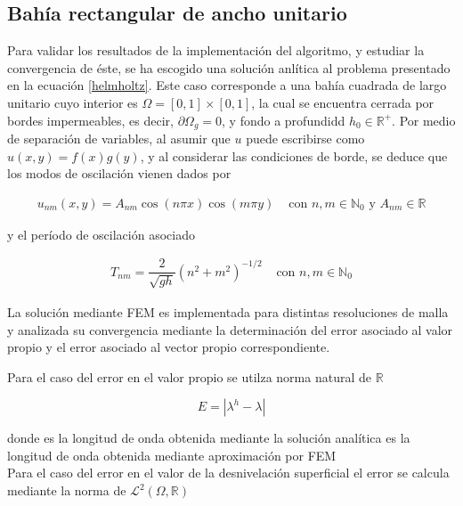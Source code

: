  \subsection{Bah\'ia rectangular de ancho unitario}
  Para validar los resultados de la implementaci\'on del algoritmo, y estudiar la convergencia de \'este, se ha escogido una soluci\'on anl\'itica al problema presentado en la ecuaci\'on \eqref{helmholtz}. Este caso corresponde a una bah\'ia cuadrada de largo unitario cuyo interior es $\Omega = [0,1]\times[0,1]$, la cual se encuentra cerrada por bordes impermeables, es decir, $\partial \Omega_g=0$, y fondo a profundidd $h_0\in\mathbb{R^+}$. Por medio de separaci\'on de variables, al asumir que $u$ puede escribirse como $u(x,y)=f(x)g(y)$, y al considerar las condiciones de borde, se deduce que los modos de oscilaci\'on vienen dados por 
  
  \begin{equation}
    \begin{array}{cc}
    u_{nm}(x,y)=A_{nm}\cos(n\pi x)\cos(m\pi y) & \text{ con } n,m \in \mathbb{N}_0 \text{ y } A_{nm}\in\mathbb{R}
    \end{array}
    \label{eq:bahia_cerrada_modo}
  \end{equation}

  y el per\'iodo de oscilaci\'on asociado
  
  \begin{equation}
    \begin{array}{cc}
    T_{nm}=\dfrac{2}{\sqrt{gh}}\left( n^2+m^2\right)^{-1/2} & \text{ con } n,m \in \mathbb{N}_0
    \end{array}
    \label{eq:bahia_cerrada_periodo}
  \end{equation}

La soluci\'on mediante FEM es implementada para distintas resoluciones de malla y analizada su convergencia mediante la determinaci\'on del error asociado al valor propio y el error asociado al vector propio correspondiente.

Para el caso del error en el valor propio se utilza norma natural de $\mathbb{R}$

$$E = |\lambda^h - \lambda|$$

donde  \hilight{$\lambda$} es la longitud de onda obtenida mediante la soluci\'on anal\'itica  es la longitud de onda obtenida mediante aproximaci\'on por FEM\\

Para el caso del error en el valor de la desnivelaci\'on superficial el error se calcula mediante la norma de $\mathcal{L}^2(\Omega,\mathbb{R})$

